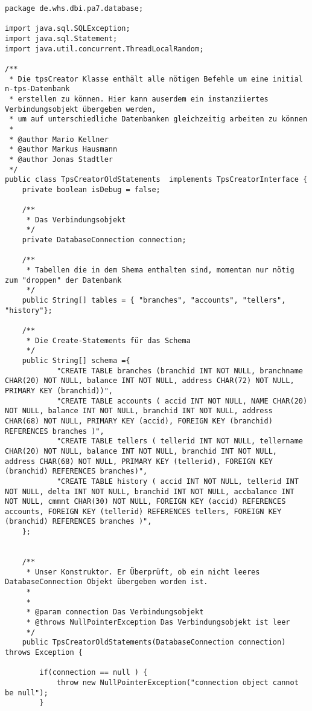 \begin{lstlisting}[caption={TpsCreatorOldStatements (optimiert)}, label={lst:tpsoldv2}]
package de.whs.dbi.pa7.database;

import java.sql.SQLException;
import java.sql.Statement;
import java.util.concurrent.ThreadLocalRandom;

/**
 * Die tpsCreator Klasse enthält alle nötigen Befehle um eine initial n-tps-Datenbank
 * erstellen zu können. Hier kann auserdem ein instanziiertes Verbindungsobjekt übergeben werden,
 * um auf unterschiedliche Datenbanken gleichzeitig arbeiten zu können
 * 
 * @author Mario Kellner
 * @author Markus Hausmann
 * @author Jonas Stadtler
 */
public class TpsCreatorOldStatements  implements TpsCreatorInterface {
	private boolean isDebug = false;
	
	/**
	 * Das Verbindungsobjekt
	 */
	private DatabaseConnection connection;
	
	/**
	 * Tabellen die in dem Shema enthalten sind, momentan nur nötig zum "droppen" der Datenbank
	 */
	public String[] tables = { "branches", "accounts", "tellers", "history"};
	
	/**
	 * Die Create-Statements für das Schema
	 */
	public String[] schema ={
			"CREATE TABLE branches (branchid INT NOT NULL, branchname CHAR(20) NOT NULL, balance INT NOT NULL, address CHAR(72) NOT NULL, PRIMARY KEY (branchid))",
			"CREATE TABLE accounts ( accid INT NOT NULL, NAME CHAR(20) NOT NULL, balance INT NOT NULL, branchid INT NOT NULL, address CHAR(68) NOT NULL, PRIMARY KEY (accid), FOREIGN KEY (branchid) REFERENCES branches )",
			"CREATE TABLE tellers ( tellerid INT NOT NULL, tellername CHAR(20) NOT NULL, balance INT NOT NULL, branchid INT NOT NULL, address CHAR(68) NOT NULL, PRIMARY KEY (tellerid), FOREIGN KEY (branchid) REFERENCES branches)",
			"CREATE TABLE history ( accid INT NOT NULL, tellerid INT NOT NULL, delta INT NOT NULL, branchid INT NOT NULL, accbalance INT NOT NULL, cmmnt CHAR(30) NOT NULL, FOREIGN KEY (accid) REFERENCES accounts, FOREIGN KEY (tellerid) REFERENCES tellers, FOREIGN KEY (branchid) REFERENCES branches )",
	};
	
	
	/**
	 * Unser Konstruktor. Er Überprüft, ob ein nicht leeres DatabaseConnection Objekt übergeben worden ist.
	 * 
	 * 
	 * @param connection Das Verbindungsobjekt
	 * @throws NullPointerException Das Verbindungsobjekt ist leer 
	 */
	public TpsCreatorOldStatements(DatabaseConnection connection) throws Exception {
		
		if(connection == null ) {
			throw new NullPointerException("connection object cannot be null");
		}
		

\end{lstlisting}
